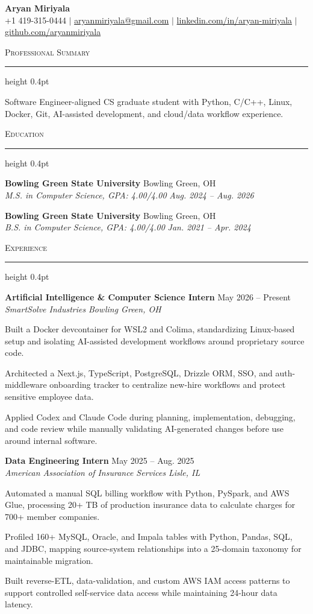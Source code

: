 \documentclass[letterpaper,11pt]{article}
\newcommand{\resumesection}[1]{%
  \par\vspace{2pt}%
  {\large\scshape #1}\par\vspace{2pt}%
  \hrule height 0.4pt\vspace{2pt}%
}
\newcommand{\resumeSubheading}[4]{
  \textbf{#1} \hfill #2\\
  \textit{#3} \hfill \textit{#4}
}
\begin{document}
\begin{center}
  {\LARGE \textbf{Aryan Miriyala}}\\[-1pt]
  \small
  +1 419-315-0444 $|$
  \href{mailto:aryanmiriyala@gmail.com}{aryanmiriyala@gmail.com} $|$
  \href{https://www.linkedin.com/in/aryan-miriyala-7788a21b6/}{linkedin.com/in/aryan-miriyala} $|$
  \href{https://github.com/aryanmiriyala}{github.com/aryanmiriyala}
\end{center}\vspace{-10pt}

\resumesection{Professional Summary}
Software Engineer-aligned CS graduate student with Python, C/C++, Linux, Docker, Git, AI-assisted development, and cloud/data workflow experience.

\resumesection{Education}
\resumeSubheading
{Bowling Green State University}{Bowling Green, OH}
{M.S. in Computer Science, GPA: 4.00/4.00}{Aug. 2024 -- Aug. 2026}

\resumeSubheading
{Bowling Green State University}{Bowling Green, OH}
{B.S. in Computer Science, GPA: 4.00/4.00}{Jan. 2021 -- Apr. 2024}

\resumesection{Experience}
\resumeSubheading
{Artificial Intelligence \& Computer Science Intern}{May 2026 -- Present}
{SmartSolve Industries}{Bowling Green, OH}
\begin{tightitemize}
  \item Built a Docker devcontainer for WSL2 and Colima, standardizing Linux-based setup and isolating AI-assisted development workflows around proprietary source code.
  \item Architected a Next.js, TypeScript, PostgreSQL, Drizzle ORM, SSO, and auth-middleware onboarding tracker to centralize new-hire workflows and protect sensitive employee data.
  \item Applied Codex and Claude Code during planning, implementation, debugging, and code review while manually validating AI-generated changes before use around internal software.
\end{tightitemize}

\resumeSubheading
{Data Engineering Intern}{May 2025 -- Aug. 2025}
{American Association of Insurance Services}{Lisle, IL}
\begin{tightitemize}
  \item Automated a manual SQL billing workflow with Python, PySpark, and AWS Glue, processing 20+ TB of production insurance data to calculate charges for 700+ member companies.
  \item Profiled 160+ MySQL, Oracle, and Impala tables with Python, Pandas, SQL, and JDBC, mapping source-system relationships into a 25-domain taxonomy for maintainable migration.
  \item Built reverse-ETL, data-validation, and custom AWS IAM access patterns to support controlled self-service data access while maintaining 24-hour data latency.
\end{tightitemize}
\end{document}
